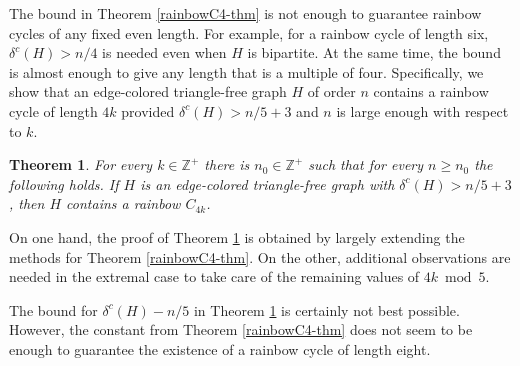 \documentclass{article}
\newtheorem{theorem}{Theorem}[section]
\newtheorem{example}[theorem]{Example}
\begin{document}
 The bound  in Theorem \ref{rainbowC4-thm} is not enough to guarantee rainbow cycles of any fixed even length. For example, for a rainbow cycle of length six, $\delta^c(H)> n/4$ is needed even when $H$ is bipartite. At the same time, the bound is almost enough to give any length that is a multiple of four. Specifically, we show that an edge-colored triangle-free graph $H$ of order $n$ contains a rainbow cycle of length $4k$ provided $\delta^c(H)> n/5+ 3$  and $n$ is large enough with respect to $k$. 
\begin{theorem}\label{rainbowgeneral-thm}
For every $k\in \mathbb{Z}^+$ there is $n_0\in \mathbb{Z}^+$  such that for every $n\geq n_0$ the following holds. If $H$ is an edge-colored triangle-free graph with $\delta^c(H)>n/5 +3$, then $H$ contains a rainbow $C_{4k}$.
\end{theorem}
On one hand, the proof of  Theorem \ref{rainbowgeneral-thm} is obtained by largely extending the methods for Theorem \ref{rainbowC4-thm}. On the other, additional observations are needed in the extremal case to take care of the remaining values of $4k \bmod 5 $.

The bound for $\delta^c(H)-n/5$  in Theorem \ref{rainbowgeneral-thm} is certainly not best possible. However,  the constant from Theorem \ref{rainbowC4-thm} does not seem to be enough to guarantee the existence of a rainbow cycle of length eight.
    
\end{document}
